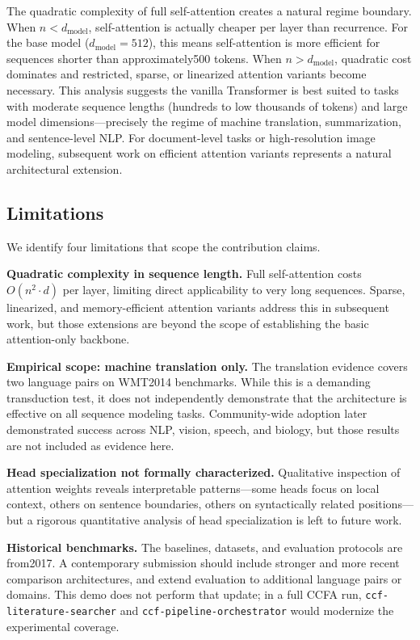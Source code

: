 ﻿\documentclass{article}
\begin{document}
The quadratic complexity of full self-attention creates a natural regime boundary. When $n < d_{\text{model}}$, self-attention is actually cheaper per layer than recurrence. For the base model ($d_{\text{model}}=512$), this means self-attention is more efficient for sequences shorter than approximately500 tokens. When $n > d_{\text{model}}$, quadratic cost dominates and restricted, sparse, or linearized attention variants become necessary. This analysis suggests the vanilla Transformer is best suited to tasks with moderate sequence lengths (hundreds to low thousands of tokens) and large model dimensions---precisely the regime of machine translation, summarization, and sentence-level NLP. For document-level tasks or high-resolution image modeling, subsequent work on efficient attention variants represents a natural architectural extension.

\subsection{Limitations}

We identify four limitations that scope the contribution claims.

\textbf{Quadratic complexity in sequence length.} Full self-attention costs $O(n^2 \cdot d)$ per layer, limiting direct applicability to very long sequences. Sparse, linearized, and memory-efficient attention variants address this in subsequent work, but those extensions are beyond the scope of establishing the basic attention-only backbone.

\textbf{Empirical scope: machine translation only.} The translation evidence covers two language pairs on WMT2014 benchmarks. While this is a demanding transduction test, it does not independently demonstrate that the architecture is effective on all sequence modeling tasks. Community-wide adoption later demonstrated success across NLP, vision, speech, and biology, but those results are not included as evidence here.

\textbf{Head specialization not formally characterized.} Qualitative inspection of attention weights reveals interpretable patterns---some heads focus on local context, others on sentence boundaries, others on syntactically related positions---but a rigorous quantitative analysis of head specialization is left to future work.

\textbf{Historical benchmarks.} The baselines, datasets, and evaluation protocols are from2017. A contemporary submission should include stronger and more recent comparison architectures, and extend evaluation to additional language pairs or domains. This demo does not perform that update; in a full CCFA run, \texttt{ccf-literature-searcher} and \texttt{ccf-pipeline-orchestrator} would modernize the experimental coverage.
\end{document}
